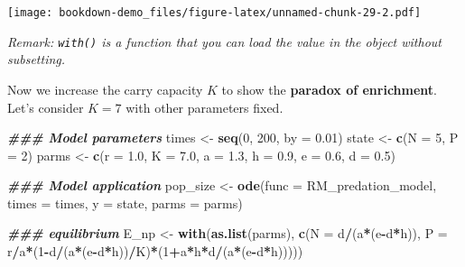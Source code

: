 \documentclass[
]{book}
\newenvironment{Shaded}{\begin{snugshade}}{\end{snugshade}}
\newcommand{\AttributeTok}[1]{\textcolor[rgb]{0.13,0.29,0.53}{#1}}
\newcommand{\DecValTok}[1]{\textcolor[rgb]{0.00,0.00,0.81}{#1}}
\newcommand{\DocumentationTok}[1]{\textcolor[rgb]{0.56,0.35,0.01}{\textbf{\textit{#1}}}}
\newcommand{\FloatTok}[1]{\textcolor[rgb]{0.00,0.00,0.81}{#1}}
\newcommand{\FunctionTok}[1]{\textcolor[rgb]{0.13,0.29,0.53}{\textbf{#1}}}
\newcommand{\NormalTok}[1]{#1}
\newcommand{\OtherTok}[1]{\textcolor[rgb]{0.56,0.35,0.01}{#1}}
\newcommand{\SpecialCharTok}[1]{\textcolor[rgb]{0.81,0.36,0.00}{\textbf{#1}}}
\begin{document}
\texttt{[image: bookdown-demo\_files/figure-latex/unnamed-chunk-29-2.pdf]}

\emph{Remark: \texttt{with()} is a function that you can load the value in the object without subsetting.}

Now we increase the carry capacity \(K\) to show the \textbf{paradox of enrichment}. Let's consider \(K = 7\) with other parameters fixed.

\begin{Shaded}
\begin{Highlighting}[]
\DocumentationTok{\#\#\# Model parameters}
\NormalTok{times }\OtherTok{\textless{}{-}} \FunctionTok{seq}\NormalTok{(}\DecValTok{0}\NormalTok{, }\DecValTok{200}\NormalTok{, }\AttributeTok{by =} \FloatTok{0.01}\NormalTok{)  }
\NormalTok{state }\OtherTok{\textless{}{-}} \FunctionTok{c}\NormalTok{(}\AttributeTok{N =} \DecValTok{5}\NormalTok{, }\AttributeTok{P =} \DecValTok{2}\NormalTok{)  }
\NormalTok{parms }\OtherTok{\textless{}{-}} \FunctionTok{c}\NormalTok{(}\AttributeTok{r =} \FloatTok{1.0}\NormalTok{, }\AttributeTok{K =} \FloatTok{7.0}\NormalTok{, }\AttributeTok{a =} \FloatTok{1.3}\NormalTok{, }\AttributeTok{h =} \FloatTok{0.9}\NormalTok{, }\AttributeTok{e =} \FloatTok{0.6}\NormalTok{, }\AttributeTok{d =} \FloatTok{0.5}\NormalTok{) }

\DocumentationTok{\#\#\# Model application}
\NormalTok{pop\_size }\OtherTok{\textless{}{-}} \FunctionTok{ode}\NormalTok{(}\AttributeTok{func =}\NormalTok{ RM\_predation\_model, }\AttributeTok{times =}\NormalTok{ times, }\AttributeTok{y =}\NormalTok{ state, }\AttributeTok{parms =}\NormalTok{ parms)}

\DocumentationTok{\#\#\# equilibrium}
\NormalTok{E\_np }\OtherTok{\textless{}{-}} \FunctionTok{with}\NormalTok{(}\FunctionTok{as.list}\NormalTok{(parms), }
             \FunctionTok{c}\NormalTok{(}\AttributeTok{N =}\NormalTok{ d}\SpecialCharTok{/}\NormalTok{(a}\SpecialCharTok{*}\NormalTok{(e}\SpecialCharTok{{-}}\NormalTok{d}\SpecialCharTok{*}\NormalTok{h)),}
               \AttributeTok{P =}\NormalTok{ r}\SpecialCharTok{/}\NormalTok{a}\SpecialCharTok{*}\NormalTok{(}\DecValTok{1}\SpecialCharTok{{-}}\NormalTok{d}\SpecialCharTok{/}\NormalTok{(a}\SpecialCharTok{*}\NormalTok{(e}\SpecialCharTok{{-}}\NormalTok{d}\SpecialCharTok{*}\NormalTok{h))}\SpecialCharTok{/}\NormalTok{K)}\SpecialCharTok{*}\NormalTok{(}\DecValTok{1}\SpecialCharTok{+}\NormalTok{a}\SpecialCharTok{*}\NormalTok{h}\SpecialCharTok{*}\NormalTok{d}\SpecialCharTok{/}\NormalTok{(a}\SpecialCharTok{*}\NormalTok{(e}\SpecialCharTok{{-}}\NormalTok{d}\SpecialCharTok{*}\NormalTok{h)))))}
\end{Highlighting}
\end{Shaded}
\end{document}
